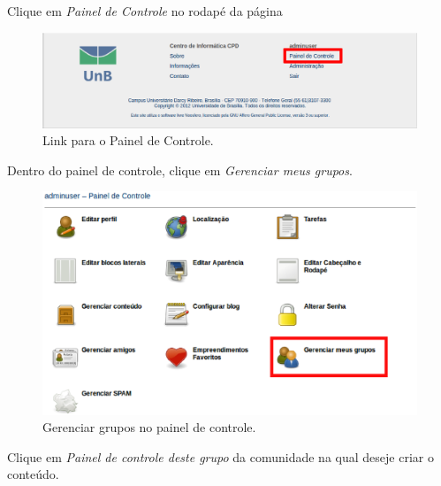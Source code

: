 Clique em \emph{\color{red}Painel de Controle} no rodapé da página

\begin{figure}[H]
  \centering
    \includegraphics[keepaspectratio=true,scale=0.49]{figuras/linkPainelControle.eps} 
  \caption{Link para o Painel de Controle.}
  \label{fig:linkPainelControle}
\end{figure}

\newpage
Dentro do painel de controle, clique em \emph{\color{red}Gerenciar meus grupos}.

\begin{figure}[H]
  \centering
    \includegraphics[keepaspectratio=true,scale=0.49]{figuras/painelDeControle.eps}
  \caption{Gerenciar grupos no painel de controle.}
  \label{fig:GerGrupPainelControle}
\end{figure}

Clique em \emph{\color{red}Painel de controle deste grupo} da comunidade na qual deseje criar o conteúdo.


